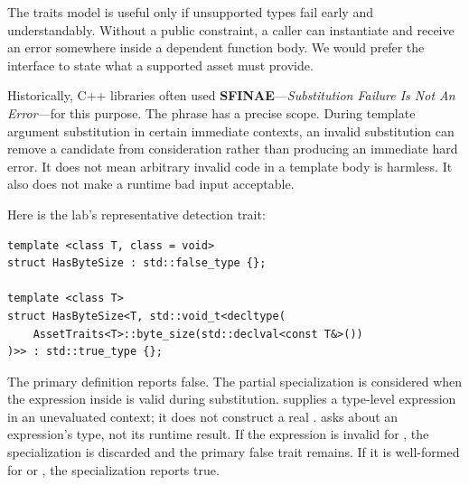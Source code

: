 \hypertarget{05-engine-i-ch005-a-generic-function-still-needs-a-boundary-describing-which-types-qualify}{}

The traits model is useful only if unsupported types fail early and understandably. Without a public constraint, a caller can instantiate  and receive an error somewhere inside a dependent function body. We would prefer the interface to state what a supported asset must provide.

Historically, C++ libraries often used \textbf{SFINAE}---\emph{Substitution Failure Is Not An Error}---for this purpose. The phrase has a precise scope. During template argument substitution in certain immediate contexts, an invalid substitution can remove a candidate from consideration rather than producing an immediate hard error. It does not mean arbitrary invalid code in a template body is harmless. It also does not make a runtime bad input acceptable.

Here is the lab's representative detection trait:

\begin{verbatim}
template <class T, class = void>
struct HasByteSize : std::false_type {};

template <class T>
struct HasByteSize<T, std::void_t<decltype(
    AssetTraits<T>::byte_size(std::declval<const T&>())
)>> : std::true_type {};
\end{verbatim}

The primary definition reports false. The partial specialization is considered when the expression inside  is valid during substitution.  supplies a type-level expression in an unevaluated context; it does not construct a real .  asks about an expression's type, not its runtime result. If the expression is invalid for , the specialization is discarded and the primary false trait remains. If it is well-formed for  or , the specialization reports true.

